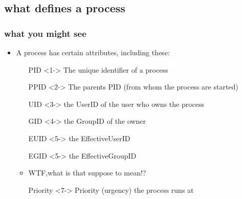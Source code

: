 \documentclass[hyperref={pdfpagelabels=false}]{beamer}
\begin{document}
    \subsection{what defines a process}
		\begin{frame}
			\frametitle{what you might see}
			\begin{itemize}
				\item<1-> A process has certain attributes, including these:
                \begin{itemize}
                    \item[PID]<1-> The unique identifier of a process
                    \item[PPID]<2-> The parents PID (from whom the process are started)
                    \item[UID]<3-> the UserID of the user who owns the process
                    \item[GID]<4-> the GroupID of the owner
                    \item[EUID]<5-> the EffectiveUserID
                    \item[EGID]<5-> the EffectiveGroupID
                    \item<6-> WTF,what is that suppose to mean!?
                    \item[Priority]<7-> Priority (urgency) the process runs at
                \end{itemize}
            \end{itemize}
		\end{frame}
\end{document}
